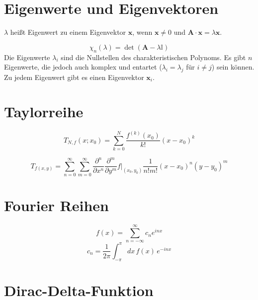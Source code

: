\newpage
\section{Eigenwerte und Eigenvektoren}

\begin{frameddefn}
	$\lambda$ heißt Eigenwert zu einem Eigenvektor $\mathbf{x}$, wenn $\mathbf{x} \neq 0$ und $\mathbf{A} \cdot \mathbf{x} = \lambda \mathbf{x}$.
\end{frameddefn}

\begin{framedthm}
	\[\chi_n(\lambda) = \det(\mathbf{A}-\lambda \mathbb{I}) \]
	Die Eigenwerte $\lambda_i$ sind die Nullstellen des charakteristischen Polynoms. Es gibt $n$ Eigenwerte, die jedoch auch komplex und entartet ($\lambda_i = \lambda_j$ für $i\neq j$) sein können. Zu jedem Eigenwert gibt es einen Eigenvektor $\mathbf{x}_i$.
\end{framedthm}

\section{Taylorreihe}

\begin{framedthm}[Taylorreihe]
	\[
	T_{N, f}(x; x_0) = \sum_{k=0}^{N} \frac{f^{(k)}(x_0)}{k!} (x-x_0)^k
	\]
\end{framedthm}

\begin{framedthm}
	\[
	T_{f(x,y)} = \sum_{n=0}^{\infty} \sum_{m=0}^{\infty} \frac{\partial^n}{\partial x^n} \frac{\partial^m}{\partial y^m} f \bigg|_{(x_0,y_0)} \frac{1}{n!m!} (x-x_0)^n (y-y_0)^m
	\]
\end{framedthm}


\section{Fourier Reihen}

\begin{framedthm}
	\[
	f(x) = \sum_{n=-\infty}^{\infty} c_n e^{inx}
	\]
	\[
	c_n = \frac{1}{2\pi} \int_{-\pi}^{\pi}dx \, f(x) \, e^{-inx}
	\]
\end{framedthm}

\section{Dirac-Delta-Funktion}

